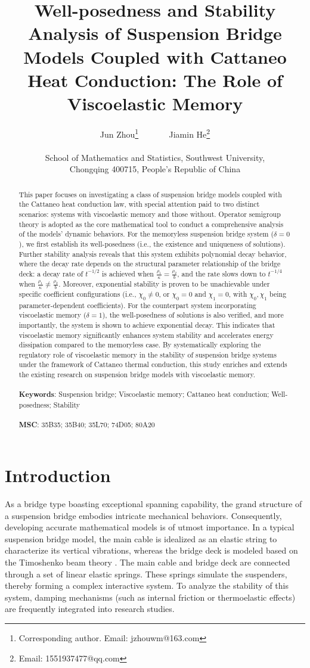 \documentclass[11pt,reqno]{article}
\title{Well-posedness and Stability Analysis of Suspension Bridge Models Coupled with Cattaneo Heat Conduction: The Role of Viscoelastic Memory}
\author{Jun Zhou\footnote{Corresponding author. Email: jzhouwm@163.com} ~~~~~~ Jiamin He\footnote{Email: 1551937477@qq.com}\\\\{School of Mathematics and Statistics, Southwest University},\\
		{Chongqing 400715, People's Republic of China}}
\date{}
\date{}
\let\Section=\section
\def\section{\setcounter{equation}{0}\Section}
\begin{document}
	\maketitle
	\begin{abstract}
This paper focuses on investigating a class of suspension bridge models coupled with the Cattaneo heat conduction law, with special attention paid to two distinct scenarios: systems with viscoelastic memory and those without. Operator semigroup theory is adopted as the core mathematical tool to conduct a comprehensive analysis of the models' dynamic behaviors. For the memoryless suspension bridge system ($\delta = 0$), we first establish its well-posedness (i.e., the existence and uniqueness of solutions). Further stability analysis reveals that this system exhibits polynomial decay behavior, where the decay rate depends on the structural parameter relationship of the bridge deck: a decay rate of $t^{-1/2}$ is achieved when $\frac{\rho_1}{\kappa} = \frac{\rho_2}{b}$, and the rate slows down to $t^{-1/4}$ when $\frac{\rho_1}{\kappa} \neq \frac{\rho_2}{b}$. Moreover, exponential stability is proven to be unachievable under specific coefficient configurations (i.e., $\chi_0 \neq 0$, or $\chi_0 = 0$ and $\chi_1 = 0$, with $\chi_0, \chi_1$ being parameter-dependent coefficients). For the counterpart system incorporating viscoelastic memory ($\delta = 1$), the well-posedness of solutions is also verified, and more importantly, the system is shown to achieve exponential decay. This indicates that viscoelastic memory significantly enhances system stability and accelerates energy dissipation compared to the memoryless case. By systematically exploring the regulatory role of viscoelastic memory in the stability of suspension bridge systems under the framework of Cattaneo thermal conduction, this study enriches and extends the existing research on  suspension bridge models with viscoelastic memory.
		\\\\
		\textbf{Keywords}:  Suspension bridge; Viscoelastic memory; Cattaneo heat conduction; Well-posedness; Stability\\\\
\textbf{MSC}:  35B35; 35B40; 35L70; 74D05; 80A20
	\end{abstract}
\section{Introduction}
As a bridge type boasting exceptional spanning capability, the grand structure of a suspension bridge embodies intricate mechanical behaviors. Consequently, developing accurate mathematical models is of utmost importance. In a typical suspension bridge model, the main cable is idealized as an elastic string to characterize its vertical vibrations, whereas the bridge deck is modeled based on the Timoshenko beam theory \cite{timoshenko1921lxvi}. The main cable and bridge deck are connected through a set of linear elastic springs. These springs simulate the suspenders, thereby forming a complex interactive system. To analyze the stability of this system, damping mechanisms (such as internal friction or thermoelastic effects) are frequently integrated into research studies.
\end{document}
